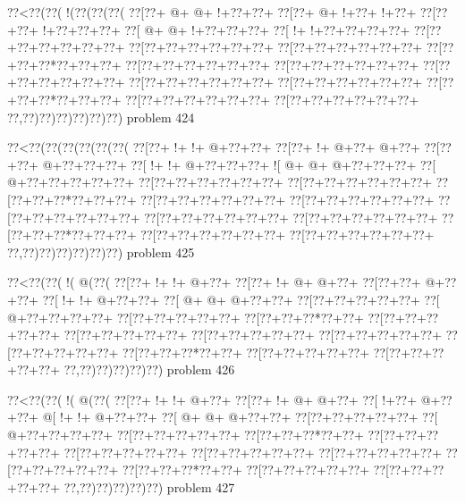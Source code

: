 \vbox{\vbox{\goo
\0??<\0??(\0??(\- !(\0??(\0??(\0??(
\0??[\0??+\- @+\- @+\- !+\0??+\0??+
\0??[\0??+\- @+\- !+\0??+\- !+\0??+
\0??[\0??+\0??+\- !+\0??+\0??+\0??+
\0??[\- @+\- @+\- !+\0??+\0??+\0??+
\0??[\- !+\- !+\0??+\0??+\0??+\0??+
\0??[\0??+\0??+\0??+\0??+\0??+\0??+
\0??[\0??+\0??+\0??+\0??+\0??+\0??+
\0??[\0??+\0??+\0??+\0??+\0??+\0??+
\0??[\0??+\0??+\0??*\0??+\0??+\0??+
\0??[\0??+\0??+\0??+\0??+\0??+\0??+
\0??[\0??+\0??+\0??+\0??+\0??+\0??+
\0??[\0??+\0??+\0??+\0??+\0??+\0??+
\0??[\0??+\0??+\0??+\0??+\0??+\0??+
\0??[\0??+\0??+\0??+\0??+\0??+\0??+
\0??[\0??+\0??+\0??*\0??+\0??+\0??+
\0??[\0??+\0??+\0??+\0??+\0??+\0??+
\0??[\0??+\0??+\0??+\0??+\0??+\0??+
\0??,\0??)\0??)\0??)\0??)\0??)\0??)
}
\hfil problem 424\hfil\break
}

\vbox{\vbox{\goo
\0??<\0??(\0??(\0??(\0??(\0??(\0??(
\0??[\0??+\- !+\- !+\- @+\0??+\0??+
\0??[\0??+\- !+\- @+\0??+\- @+\0??+
\0??[\0??+\0??+\- @+\0??+\0??+\0??+
\0??[\- !+\- !+\- @+\0??+\0??+\0??+
\- ![\- @+\- @+\- @+\0??+\0??+\0??+
\0??[\- @+\0??+\0??+\0??+\0??+\0??+
\0??[\0??+\0??+\0??+\0??+\0??+\0??+
\0??[\0??+\0??+\0??+\0??+\0??+\0??+
\0??[\0??+\0??+\0??*\0??+\0??+\0??+
\0??[\0??+\0??+\0??+\0??+\0??+\0??+
\0??[\0??+\0??+\0??+\0??+\0??+\0??+
\0??[\0??+\0??+\0??+\0??+\0??+\0??+
\0??[\0??+\0??+\0??+\0??+\0??+\0??+
\0??[\0??+\0??+\0??+\0??+\0??+\0??+
\0??[\0??+\0??+\0??*\0??+\0??+\0??+
\0??[\0??+\0??+\0??+\0??+\0??+\0??+
\0??[\0??+\0??+\0??+\0??+\0??+\0??+
\0??,\0??)\0??)\0??)\0??)\0??)\0??)
}
\hfil problem 425\hfil\break
}

\vbox{\vbox{\goo
\0??<\0??(\0??(\- !(\- @(\0??(
\0??[\0??+\- !+\- !+\- @+\0??+
\0??[\0??+\- !+\- @+\- @+\0??+
\0??[\0??+\0??+\- @+\0??+\0??+
\0??[\- !+\- !+\- @+\0??+\0??+
\0??[\- @+\- @+\- @+\0??+\0??+
\0??[\0??+\0??+\0??+\0??+\0??+
\0??[\- @+\0??+\0??+\0??+\0??+
\0??[\0??+\0??+\0??+\0??+\0??+
\0??[\0??+\0??+\0??*\0??+\0??+
\0??[\0??+\0??+\0??+\0??+\0??+
\0??[\0??+\0??+\0??+\0??+\0??+
\0??[\0??+\0??+\0??+\0??+\0??+
\0??[\0??+\0??+\0??+\0??+\0??+
\0??[\0??+\0??+\0??+\0??+\0??+
\0??[\0??+\0??+\0??*\0??+\0??+
\0??[\0??+\0??+\0??+\0??+\0??+
\0??[\0??+\0??+\0??+\0??+\0??+
\0??,\0??)\0??)\0??)\0??)\0??)
}
\hfil problem 426\hfil\break
}

\vbox{\vbox{\goo
\0??<\0??(\0??(\- !(\- @(\0??(
\0??[\0??+\- !+\- !+\- @+\0??+
\0??[\0??+\- !+\- @+\- @+\0??+
\0??[\- !+\0??+\- @+\0??+\0??+
\- @[\- !+\- !+\- @+\0??+\0??+
\0??[\- @+\- @+\- @+\0??+\0??+
\0??[\0??+\0??+\0??+\0??+\0??+
\0??[\- @+\0??+\0??+\0??+\0??+
\0??[\0??+\0??+\0??+\0??+\0??+
\0??[\0??+\0??+\0??*\0??+\0??+
\0??[\0??+\0??+\0??+\0??+\0??+
\0??[\0??+\0??+\0??+\0??+\0??+
\0??[\0??+\0??+\0??+\0??+\0??+
\0??[\0??+\0??+\0??+\0??+\0??+
\0??[\0??+\0??+\0??+\0??+\0??+
\0??[\0??+\0??+\0??*\0??+\0??+
\0??[\0??+\0??+\0??+\0??+\0??+
\0??[\0??+\0??+\0??+\0??+\0??+
\0??,\0??)\0??)\0??)\0??)\0??)
}
\hfil problem 427\hfil\break
}

